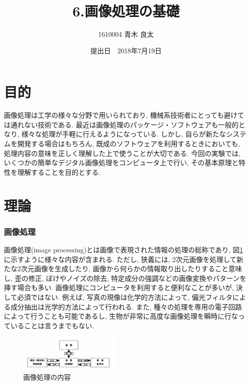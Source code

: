 \documentclass[a4paper,11pt,uplatex, titlepage]{jsarticle}
\title{6.画像処理の基礎}
\author{1610004 青木 良太}
\date{提出日　2018年7月19日} %
\begin{document}
\maketitle

\section{目的}
画像処理は工学の様々な分野で用いられており, 機械系技術者にとっても避けては通れない技術である.
最近は画像処理のパッケージ・ソフトウェアも一般的となり, 様々な処理が手軽に行えるようになっている.
しかし, 自らが新たなシステムを開発する場合はもちろん, 既成のソフトウェアを利用するときにおいても,
処理内容の意味を正しく理解した上で使うことが大切である. 今回の実験では, いくつかの簡単なデジタル画像処理をコンピュータ上で行い,
その基本原理と特性を理解することを目的とする.
\section{理論}
\subsubsection{画像処理}
画像処理(image processing)とは画像で表現された情報の処理の総称であり, 図\ref{contents}に示すように様々な内容が含まれる.
ただし, 狭義には, 2次元画像を処理して新たな2次元画像を生成したり, 画像から何らかの情報取り出したりすること意味し,
歪の修正, ぼけやノイズの除去, 特定成分の強調などの画像変換やパターンを挿す場合も多い. 画像処理にコンピュータを利用すると便利なことが多いが,
決して必須ではない. 例えば, 写真の現像は化学的方法によって, 偏光フィルタによる成分抽出は光学的方法によって行われる.
また, 種々の処理を専用の電子回路によって行うことも可能であるし, 生物が非常に高度な画像処理を瞬時に行なっていることは言うまでもない.

\begin{figure}[H]
  \begin{center}
    \includegraphics[width = 5cm]{pic/contents.png}
    \caption{画像処理の内容}
    \label{contents}
  \end{center}
\end{figure}
\end{document}
